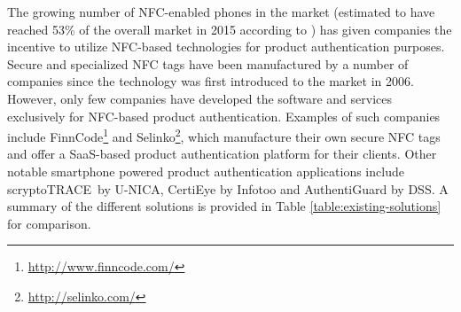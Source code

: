 \documentclass[thesis.tex]{subfiles}
\begin{document}
The growing number of NFC-enabled phones in the market (estimated to have reached 53\% of the overall market in 2015 according to \cite{frost-sullivan}) has given companies the incentive to utilize NFC-based technologies for product authentication purposes. Secure and specialized NFC tags have been manufactured by a number of companies since the technology was first introduced to the market in 2006. However, only few companies have developed the software and services exclusively for NFC-based product authentication. Examples of such companies include FinnCode\footnote{\url{http://www.finncode.com/}} and Selinko\footnote{\url{http://selinko.com/}}, which manufacture their own secure NFC tags and offer a SaaS-based product authentication platform for their clients. Other notable smartphone powered product authentication applications include scryptoTRACE\textregistered\ by U-NICA, CertiEye by Infotoo and AuthentiGuard by DSS. A summary of the different solutions is provided in Table \ref{table:existing-solutions} for comparison.
\end{document}
